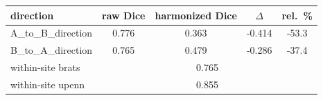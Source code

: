 \begin{tabular}{lcccc}
\toprule
direction & raw Dice & harmonized Dice & $\Delta$ & rel.\ \% \\
\midrule
A_to_B_direction & 0.776 & 0.363 & -0.414 & -53.3 \\
B_to_A_direction & 0.765 & 0.479 & -0.286 & -37.4 \\
\midrule
within-site brats & \multicolumn{4}{c}{0.765} \\
within-site upenn & \multicolumn{4}{c}{0.855} \\
\bottomrule
\end{tabular}
